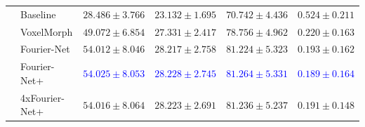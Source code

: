 \begin{table}[H]
\begin{tabularx}{\textwidth}{c Y Y Y Y Y}
		\midrule		
		 & Baseline & $28.486 \pm 3.766$ & $23.132 \pm 1.695$ & $70.742 \pm 4.436$ & $0.524 \pm 0.211$ \\  
		 & VoxelMorph & $49.072 \pm 6.854$ & $27.331 \pm 2.417$ & $78.756 \pm 4.962$ & $0.220 \pm 0.163$ \\ 
		 & Fourier-Net & $54.012 \pm 8.046$ & $28.217 \pm 2.758$ & $81.224 \pm 5.323$ & $0.193 \pm 0.162$ \\  
		 & Fourier-Net+ & \textcolor{blue}{$54.025 \pm 8.053$} & \textcolor{blue}{$28.228 \pm 2.745$} & \textcolor{blue}{$81.264 \pm 5.331$} & \textcolor{blue}{$0.189 \pm 0.164$} \\    
		 & \mbox{4xFourier-Net+} & $54.016 \pm 8.064$ & $28.223 \pm 2.691$ & $81.236 \pm 5.237$ & $0.191 \pm 0.148$ \\ 
		 \bottomrule
	\end{tabularx}
\end{table}


